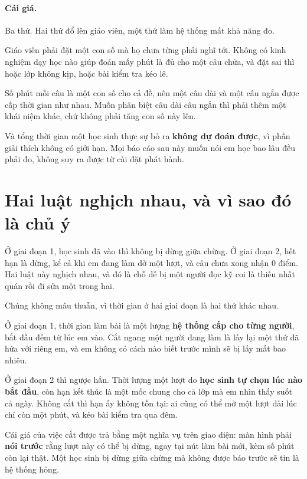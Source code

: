 \paragraph{Cái giá.} Ba thứ. Hai thứ đổ lên giáo viên, một thứ làm hệ thống mất khả năng đo.

Giáo viên phải đặt một con số mà họ chưa từng phải nghĩ tới. Không có kinh nghiệm dạy học nào
giúp đoán mấy phút là đủ cho một câu chữa, và đặt sai thì hoặc lớp không kịp, hoặc bài kiểm tra
kéo lê.

Số phút mỗi câu là một con số cho cả đề, nên một câu dài và một câu ngắn được cấp thời gian như
nhau. Muốn phân biệt câu dài câu ngắn thì phải thêm một khái niệm khác, chứ không phải tăng con
số này lên.

Và tổng thời gian một học sinh thực sự bỏ ra \textbf{không dự đoán được}, vì phần giải thích
không có giới hạn. Mọi báo cáo sau này muốn nói em học bao lâu đều phải đo, không suy ra được từ
cài đặt phát hành.

\section{Hai luật nghịch nhau, và vì sao đó là chủ ý}
\label{sec:hai-luat-nghich}

Ở giai đoạn 1, học sinh đã vào thì không bị dừng giữa chừng. Ở giai đoạn 2, hết hạn là dừng, kể
cả khi em đang làm dở một lượt, và câu chưa xong nhận 0 điểm. Hai luật này nghịch nhau, và đó là
chỗ dễ bị một người đọc kỹ coi là thiếu nhất quán rồi đi sửa một trong hai.

Chúng không mâu thuẫn, vì thời gian ở hai giai đoạn là hai thứ khác nhau.

Ở giai đoạn 1, thời gian làm bài là một lượng \textbf{hệ thống cấp cho từng người}, bắt đầu đếm
từ lúc em vào. Cắt ngang một người đang làm là lấy lại một thứ đã hứa với riêng em, và em không
có cách nào biết trước mình sẽ bị lấy mất bao nhiêu.

Ở giai đoạn 2 thì ngược hẳn. Thời lượng một lượt do \textbf{học sinh tự chọn lúc nào bắt đầu},
còn hạn kết thúc là một mốc chung cho cả lớp mà em nhìn thấy suốt cả ngày. Không cắt thì hạn ấy
không tồn tại: ai cũng có thể mở một lượt dài lúc chỉ còn một phút, và kéo bài kiểm tra qua đêm.

Cái giá của việc cắt được trả bằng một nghĩa vụ trên giao diện: màn hình phải \textbf{nói trước}
rằng lượt này có thể bị dừng, ngay tại nút làm bài mới, kèm số phút còn lại thật. Một học sinh bị
dừng giữa chừng mà không được báo trước sẽ tin là hệ thống hỏng.

